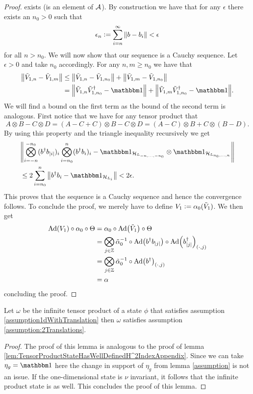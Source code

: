 \documentclass[11pt,a4paper,twoside]{article}
\numberwithin{equation}{section}
\begin{document}
\begin{proof}
		exists (is an element of $\AA$). By construction we have that for any $\epsilon$ there exists an $n_0>0$ such that
		\begin{equation}
			\epsilon_n\defeq\sum_{i=n}^\infty\norm{b-b_i}<\epsilon
		\end{equation}
		for all $n>n_0$. We will now show that our sequence is a Cauchy sequence. Let $\epsilon>0$ and take $n_0$ accordingly. For any $n,m\geq n_0$ we have that
		\begin{align}
			\norm{\tilde{V}_{1,n}-\tilde{V}_{1,m}}&\leq \norm{\tilde{V}_{1,n}-\tilde{V}_{1,n_0}}+\norm{\tilde{V}_{1,m}-\tilde{V}_{1,n_0}}\\
			&=\norm{\tilde{V}_{1,n}\tilde{V}_{1,n_0}^\dagger-\id}+\norm{\tilde{V}_{1,m}\tilde{V}_{1,n_0}^\dagger-\id}.
		\end{align}
		We will find a bound on the first term as the bound of the second term is analogous. First notice that we have for any tensor product that
		\begin{equation}
			A\otimes B-C\otimes D=(A-C+C)\otimes B-C\otimes D=(A-C)\otimes B+C\otimes (B-D).
		\end{equation}
		By using this property and the triangle inequality recursively we get
		\begin{align}
			&\norm{\bigotimes_{i=-n}^{-n_0}(b^\dagger b_\abs{i})_i\bigotimes_{i=n_0}^{n}(b^\dagger b_i)_i-\id_{\HH_{L_{-n,\ldots,-n_0}}}\otimes\id_{\HH_{L_{n_0,\ldots,n}}}}\\
			&\leq 2\sum_{i=n_0}^{n}\norm{b^\dagger b_i-\id_{\HH_{L_i}}}<2\epsilon.
		\end{align}
		This proves that the sequence is a Cauchy sequence and hence the convergence follows. To conclude the proof, we merely have to define $V_1\defeq \alpha_0(\tilde{V}_1)$. We then get
		\begin{align}
			\Ad{V_1}\circ \alpha_0\circ \Theta&= \alpha_0\circ\Ad{\tilde V_1}\circ \Theta\\
			&=\bigotimes_{j\in\ZZ}\tilde\alpha_0^{-1}\circ\Ad{b^\dagger b_\abs{j}}\circ \Ad{b_\abs{j}^\dagger}_{(\cdot,j)}\\
			&=\bigotimes_{j\in\ZZ}\tilde\alpha_0^{-1}\circ\Ad{b^\dagger}_{(\cdot,j)}\\
			&=\alpha
		\end{align}
		concluding the proof.
	\end{proof}
	\begin{lemma}\label{lem:TensorProductStateHasWellDefinedH^1IndexAppendix}
		Let $\omega$ be the infinite tensor product of a state $\phi$ that satisfies assumption \ref{assumption1dWithTranslation} then $\omega$ satisfies assumption \ref{assumption:2Translations}.
	\end{lemma}
	\begin{proof}
		The proof of this lemma is analogous to the proof of lemma \ref{lem:TensorProductStateHasWellDefinedH^2IndexAppendix}. Since we can take $\eta_g=\id$ here the change in support of $\eta_g$ from lemma \ref{assumption} is not an issue. If the one-dimensional state is $\nu$ invariant, it follows that the infinite product state is as well. This concludes the proof of this lemma.
	\end{proof}
\end{document}
